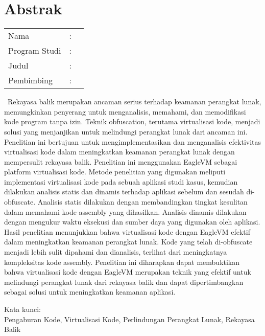 %
%
%

\chapter*{Abstrak}

\vspace*{0.2cm}
{
	\setlength{\parindent}{0pt}

	\begin{tabular}{@{}l l p{10cm}}
		Nama          & : & \penulis    \\
		Program Studi & : & \program    \\
		Judul         & : & \judul      \\
		Pembimbing    & : & \pembimbing \\
	\end{tabular}

	\bigskip
	\bigskip

	\cc\ Rekayasa balik merupakan ancaman serius terhadap keamanan perangkat lunak, memungkinkan penyerang untuk menganalisis, memahami, dan memodifikasi kode program tanpa izin. Teknik obfuscation, terutama virtualisasi kode, menjadi solusi yang menjanjikan untuk melindungi perangkat lunak dari ancaman ini. Penelitian ini bertujuan untuk mengimplementasikan dan menganalisis efektivitas virtualisasi kode dalam meningkatkan keamanan perangkat lunak dengan mempersulit rekayasa balik. Penelitian ini menggunakan EagleVM sebagai platform virtualisasi kode. Metode penelitian yang digunakan meliputi implementasi virtualisasi kode pada sebuah aplikasi studi kasus, kemudian dilakukan analisis statis dan dinamis terhadap aplikasi sebelum dan sesudah di-obfuscate. Analisis statis dilakukan dengan membandingkan tingkat kesulitan dalam memahami kode assembly yang dihasilkan. Analisis dinamis dilakukan dengan mengukur waktu eksekusi dan sumber daya yang digunakan oleh aplikasi. Hasil penelitian menunjukkan bahwa virtualisasi kode dengan EagleVM efektif dalam meningkatkan keamanan perangkat lunak. Kode yang telah di-obfuscate menjadi lebih sulit dipahami dan dianalisis, terlihat dari meningkatnya kompleksitas kode assembly. Penelitian ini diharapkan dapat membuktikan bahwa virtualisasi kode dengan EagleVM merupakan teknik yang efektif untuk melindungi perangkat lunak dari rekayasa balik dan dapat dipertimbangkan sebagai solusi untuk meningkatkan keamanan aplikasi.

	\bigskip

	Kata kunci:\\
	Pengaburan Kode, Virtualisasi Kode, Perlindungan Perangkat Lunak, Rekayasa Balik
}

\newpage
